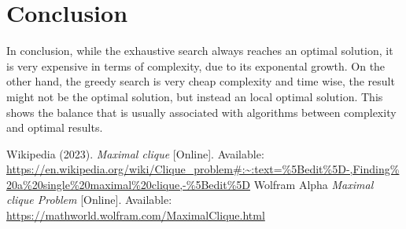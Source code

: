 \documentclass[]{revdetua}
\begin{document}
\section{Conclusion}

In conclusion, while the exhaustive search always reaches an optimal solution, it is very expensive in terms of complexity, due to its exponental growth. On the other hand, the greedy search is very cheap complexity and time wise, the result might not be the optimal solution, but instead an local optimal solution. This shows the balance that is usually associated with algorithms between complexity and optimal results.

\begin{thebibliography}{00}

 Wikipedia (2023). \textit{Maximal clique} [Online]. Available: \url{https://en.wikipedia.org/wiki/Clique_problem#:~:text=%5Bedit%5D-,Finding%20a%20single%20maximal%20clique,-%5Bedit%5D}
 Wolfram Alpha \textit{Maximal clique Problem} [Online]. Available: \url{https://mathworld.wolfram.com/MaximalClique.html}

\end{thebibliography}
\end{document}

